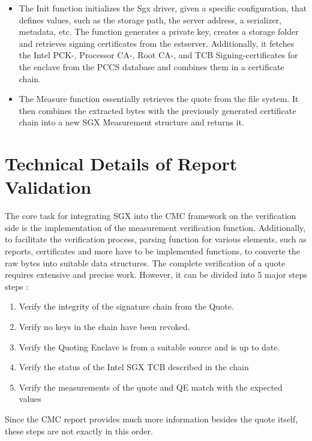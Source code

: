 \begin{itemize}
	\item The Init function initializes the Sgx driver, given a specific configuration, that defines values, such as the storage path, the server address, a serializer, metadata, etc.
	The function generates a private key, creates a storage folder and retrieves signing certificates from the estserver. Additionally, it fetches the Intel PCK-, Processor CA-, Root CA-, and TCB Signing-certificates for the enclave from the PCCS database and combines them in a certificate chain. 
	
	\item The Measure function essentially retrieves the quote from the file system. It then combines the extracted bytes with the previously generated certificate chain into a new SGX Measurement structure and returns it.
\end{itemize}

\section{Technical Details of Report Validation}
The core task for integrating SGX into the CMC framework on the verification side is the implementation of the measurement verification function.  Additionally, to facilitate the verification process, parsing function for various elements, such as reports, certificates and more have to be implemented functions, to converte the raw bytes into suitable data structures. 
The complete verification of a quote requires extensive and precise work. 
However, it can be divided into 5 major steps steps \cite{sgx_attestation_paper}:

\begin{enumerate}
	\item Verify the integrity of the signature chain from the Quote.
	\item Verify no keys in the chain have been revoked. 
	\item Verify the Quoting Enclave is from a suitable source and is up to date. 
	\item Verify the status of the Intel SGX TCB described in the chain 
	\item Verify the measurements of the quote and QE match with the expected values  
\end{enumerate}

Since the CMC report provides much more information besides the quote itself, these steps are not exactly in this order.

